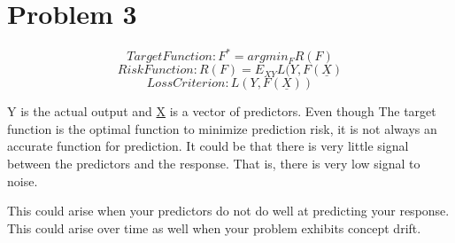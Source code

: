 \documentclass[11pt]{article}
\begin{document}
\begin{center}

\ \\
\end{center}

\section*{Problem 3}

$$Target Function: F^* = argmin_FR(F)$$
$$Risk Function: R(F) = E_{XY}L(Y, F(\underline{X})$$
$$Loss Criterion: L(Y,F(\underline{X}))$$

\vspace{5 mm}
\noindent
Y is the actual output and \underline{X} is a vector of predictors. Even though 
The target function is the optimal function to minimize prediction risk, it is 
not always an accurate function for prediction. It could be that there is very 
little signal between the predictors and the response. That is, there is very 
low signal to noise.

\vspace{5 mm}
\noindent
This could arise when your predictors do not do well at predicting your 
response. This could arise over time as well when your problem exhibits 
concept drift.
\end{document}
